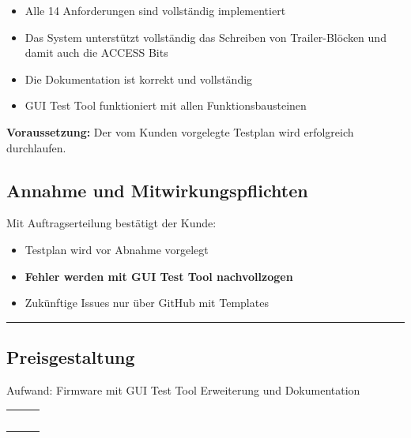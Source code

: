 \documentclass[a4paper,11pt]{article}
\providecommand{\tightlist}{\setlength{\itemsep}{0pt}\setlength{\parskip}{0pt}}
\begin{document}
\begin{itemize}
\tightlist
\item
  Alle 14 Anforderungen sind vollständig implementiert
\item
  Das System unterstützt vollständig das Schreiben von Trailer-Blöcken
  und damit auch die ACCESS Bits
\item
  Die Dokumentation ist korrekt und vollständig
\item
  GUI Test Tool funktioniert mit allen Funktionsbausteinen
\end{itemize}

\textbf{Voraussetzung:} Der vom Kunden vorgelegte Testplan wird
erfolgreich durchlaufen.

\hypertarget{annahme-und-mitwirkungspflichten}{%
\subsection{Annahme und
Mitwirkungspflichten}\label{annahme-und-mitwirkungspflichten}}

Mit Auftragserteilung bestätigt der Kunde:

\begin{itemize}
\tightlist
\item[$\square$]
  Testplan wird vor Abnahme vorgelegt
\item[$\square$]
  \textbf{Fehler werden mit GUI Test Tool nachvollzogen}
\item[$\square$]
  Zukünftige Issues nur über GitHub mit Templates
\end{itemize}

\begin{center}\rule{0.5\linewidth}{0.5pt}\end{center}

\hypertarget{preisgestaltung}{%
\subsection{Preisgestaltung}\label{preisgestaltung}}

Aufwand: Firmware mit GUI Test Tool Erweiterung und Dokumentation

\begin{tabular}{|l|l|l|}
\hline
 \\ \hline
 \\ \hline
 \\ \hline
 \\ \hline
 \\ \hline
 \\ \hline
\end{tabular}
\end{document}
